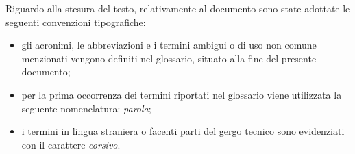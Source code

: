 Riguardo alla stesura del testo, relativamente al documento sono state adottate le seguenti convenzioni tipografiche:
\begin{itemize}
	\item gli acronimi, le abbreviazioni e i termini ambigui o di uso non comune menzionati vengono definiti nel glossario, situato alla fine del presente documento;
	\item per la prima occorrenza dei termini riportati nel glossario viene utilizzata la seguente nomenclatura: \emph{parola}\glsfirstoccur;
	\item i termini in lingua straniera o facenti parti del gergo tecnico sono evidenziati con il carattere \emph{corsivo}.
\end{itemize}